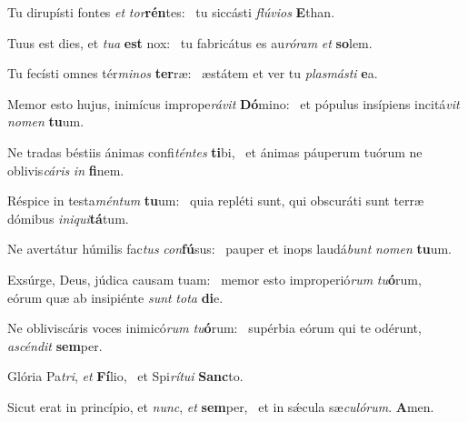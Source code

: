 \item Tu dirupísti fontes \textit{et} \textit{tor}\textbf{rén}tes:~\psstar{} tu siccásti \textit{flúvios} \textbf{E}than.
\item Tuus est dies, et \textit{tua} \textbf{est} nox:~\psstar{} tu fabricátus es au\textit{róram} \textit{et} \textbf{so}lem.
\item Tu fecísti omnes tér\textit{minos} \textbf{ter}ræ:~\psstar{} æstátem et ver tu \textit{plasmásti} \textbf{e}a.
\item Memor esto hujus, inimícus imprope\textit{rávit} \textbf{Dó}mino:~\psstar{} et pópulus insípiens incitá\textit{vit} \textit{nomen} \textbf{tu}um.
\item Ne tradas béstiis ánimas confi\textit{téntes} \textbf{ti}bi,~\psstar{} et ánimas páuperum tuórum ne oblivis\textit{cáris} \textit{in} \textbf{fi}nem.
\item Réspice in testa\textit{méntum} \textbf{tu}um:~\psstar{} quia repléti sunt, qui obscuráti sunt terræ dómibus \textit{iniqui}\textbf{tá}tum.
\item Ne avertátur húmilis fac\textit{tus} \textit{con}\textbf{fú}sus:~\psstar{} pauper et inops laudá\textit{bunt} \textit{nomen} \textbf{tu}um.
\item Exsúrge, Deus, júdica causam tuam:~\pscross{} memor esto improperió\textit{rum} \textit{tu}\textbf{ó}rum,~\psstar{} eórum quæ ab insipiénte \textit{sunt} \textit{tota} \textbf{di}e.
\item Ne obliviscáris voces inimicó\textit{rum} \textit{tu}\textbf{ó}rum:~\psstar{} supérbia eórum qui te odérunt, \textit{ascéndit} \textbf{sem}per.
\item Glória Pa\textit{tri}, \textit{et} \textbf{Fí}lio,~\psstar{} et Spi\textit{rítui} \textbf{Sanc}to.
\item Sicut erat in princípio, et \textit{nunc}, \textit{et} \textbf{sem}per,~\psstar{} et in sǽcula sæ\textit{culórum}. \textbf{A}men.
